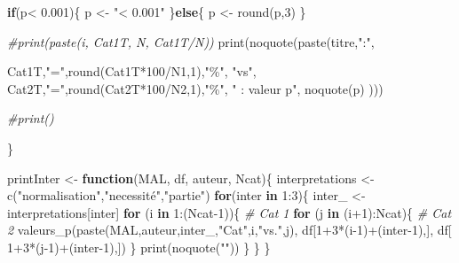 \documentclass[
]{article}
\newenvironment{Shaded}{\begin{snugshade}}{\end{snugshade}}
\newcommand{\CommentTok}[1]{\textcolor[rgb]{0.56,0.35,0.01}{\textit{#1}}}
\newcommand{\ControlFlowTok}[1]{\textcolor[rgb]{0.13,0.29,0.53}{\textbf{#1}}}
\newcommand{\DecValTok}[1]{\textcolor[rgb]{0.00,0.00,0.81}{#1}}
\newcommand{\FloatTok}[1]{\textcolor[rgb]{0.00,0.00,0.81}{#1}}
\newcommand{\FunctionTok}[1]{\textcolor[rgb]{0.00,0.00,0.00}{#1}}
\newcommand{\NormalTok}[1]{#1}
\newcommand{\OtherTok}[1]{\textcolor[rgb]{0.56,0.35,0.01}{#1}}
\newcommand{\SpecialCharTok}[1]{\textcolor[rgb]{0.00,0.00,0.00}{#1}}
\newcommand{\StringTok}[1]{\textcolor[rgb]{0.31,0.60,0.02}{#1}}
\begin{document}
\begin{Shaded}
\begin{Highlighting}[]
  \ControlFlowTok{if}\NormalTok{(p}\SpecialCharTok{\textless{}} \FloatTok{0.001}\NormalTok{)\{}
\NormalTok{    p }\OtherTok{\textless{}{-}} \StringTok{"\textless{} 0.001"}
\NormalTok{  \}}\ControlFlowTok{else}\NormalTok{\{}
\NormalTok{    p }\OtherTok{\textless{}{-}} \FunctionTok{round}\NormalTok{(p,}\DecValTok{3}\NormalTok{)}
\NormalTok{  \}}
 
      \CommentTok{\#print(paste(i, Cat1T, N, Cat1T/N))}
  \FunctionTok{print}\NormalTok{(}\FunctionTok{noquote}\NormalTok{(}\FunctionTok{paste}\NormalTok{(titre,}\StringTok{":"}\NormalTok{,}
      
\NormalTok{        Cat1T,}\StringTok{"="}\NormalTok{,}\FunctionTok{round}\NormalTok{(Cat1T}\SpecialCharTok{*}\DecValTok{100}\SpecialCharTok{/}\NormalTok{N1,}\DecValTok{1}\NormalTok{),}\StringTok{"\%"}\NormalTok{,  }
        \StringTok{"vs"}\NormalTok{,}
\NormalTok{        Cat2T,}\StringTok{"="}\NormalTok{,}\FunctionTok{round}\NormalTok{(Cat2T}\SpecialCharTok{*}\DecValTok{100}\SpecialCharTok{/}\NormalTok{N2,}\DecValTok{1}\NormalTok{),}\StringTok{"\%"}\NormalTok{,  }
        \StringTok{"    : valeur p"}\NormalTok{,}
        \FunctionTok{noquote}\NormalTok{(p)}
\NormalTok{       )))}

      \CommentTok{\#print()}
  
\NormalTok{\}}
\end{Highlighting}
\end{Shaded}

\begin{Shaded}
\begin{Highlighting}[]
\NormalTok{printInter }\OtherTok{\textless{}{-}} \ControlFlowTok{function}\NormalTok{(MAL, df, auteur, Ncat)\{}
\NormalTok{ interpretations }\OtherTok{\textless{}{-}} \FunctionTok{c}\NormalTok{(}\StringTok{"normalisation"}\NormalTok{,}\StringTok{"necessité"}\NormalTok{,}\StringTok{"partie"}\NormalTok{)}
 \ControlFlowTok{for}\NormalTok{(inter }\ControlFlowTok{in} \DecValTok{1}\SpecialCharTok{:}\DecValTok{3}\NormalTok{)\{}
\NormalTok{  inter\_ }\OtherTok{\textless{}{-}}\NormalTok{ interpretations[inter]}
  \ControlFlowTok{for}\NormalTok{ (i }\ControlFlowTok{in} \DecValTok{1}\SpecialCharTok{:}\NormalTok{(Ncat}\DecValTok{{-}1}\NormalTok{))\{             }\CommentTok{\# Cat 1}
      \ControlFlowTok{for}\NormalTok{ (j }\ControlFlowTok{in}\NormalTok{ (i}\SpecialCharTok{+}\DecValTok{1}\NormalTok{)}\SpecialCharTok{:}\NormalTok{Ncat)\{     }\CommentTok{\# Cat 2}
        \FunctionTok{valeurs\_p}\NormalTok{(}\FunctionTok{paste}\NormalTok{(MAL,auteur,inter\_,}\StringTok{"Cat"}\NormalTok{,i,}\StringTok{"vs."}\NormalTok{,j), df[}\DecValTok{1}\SpecialCharTok{+}\DecValTok{3}\SpecialCharTok{*}\NormalTok{(i}\DecValTok{{-}1}\NormalTok{)}\SpecialCharTok{+}\NormalTok{(inter}\DecValTok{{-}1}\NormalTok{),], df[ }\DecValTok{1}\SpecialCharTok{+}\DecValTok{3}\SpecialCharTok{*}\NormalTok{(j}\DecValTok{{-}1}\NormalTok{)}\SpecialCharTok{+}\NormalTok{(inter}\DecValTok{{-}1}\NormalTok{),]) }
\NormalTok{      \}}
      \FunctionTok{print}\NormalTok{(}\FunctionTok{noquote}\NormalTok{(}\StringTok{""}\NormalTok{))}
\NormalTok{    \}}
\NormalTok{  \}}
\NormalTok{\}}
\end{Highlighting}
\end{Shaded}
\end{document}

